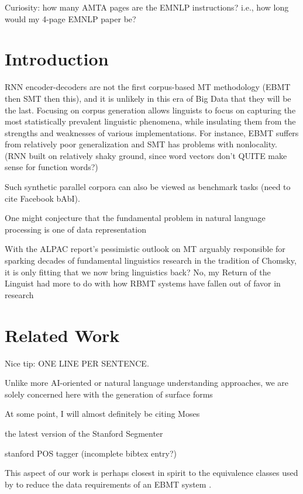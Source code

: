 Curiosity: how many AMTA pages are the EMNLP instructions? i.e., how long would my 4-page EMNLP paper be?


\section{Introduction}

RNN encoder-decoders are not the first corpus-based MT methodology (EBMT then SMT then this), and it is unlikely in this era of Big Data that they will be the last.
Focusing on corpus generation allows linguists to focus on capturing the most statistically prevalent linguistic phenomena, while insulating them from the strengths and weaknesses of various implementations.
For instance, EBMT suffers from relatively poor generalization and SMT has problems with nonlocality.
(RNN built on relatively shaky ground, since word vectors don't QUITE make sense for function words?)
 
Such synthetic parallel corpora can also be viewed as benchmark tasks (need to cite Facebook bAbI).

One might conjecture that the fundamental problem in natural language processing is one of data representation

With the ALPAC report's pessimistic outlook on MT arguably responsible for sparking decades of fundamental linguistics research in the tradition of Chomsky, it is only fitting that we now bring linguistics back?
No, my Return of the Linguist had more to do with how RBMT systems have fallen out of favor in research

\section{Related Work}
\label{sec:related}

Nice tip: ONE LINE PER SENTENCE.

Unlike more AI-oriented or natural language understanding approaches, we are solely concerned here with the generation of surface forms

At some point, I will almost definitely be citing Moses 

the latest version of the Stanford Segmenter 

stanford POS tagger (incomplete bibtex entry?) 

This aspect of our work is perhaps closest in spirit to the equivalence classes used by  to reduce the data requirements of an EBMT system .

